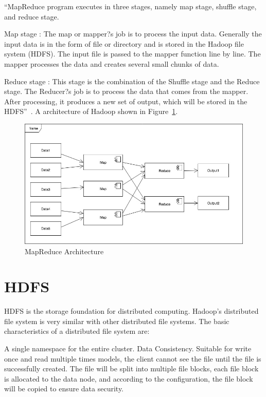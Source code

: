 ``MapReduce program executes in three stages, namely map stage, shuffle stage, and reduce stage.

Map stage : The map or mapper?s job is to process the input data. Generally the input data is in the form of file or directory and is stored in the Hadoop file system (HDFS). The input file is passed to the mapper function line by line. The mapper processes the data and creates several small chunks of data.

Reduce stage : This stage is the combination of the Shuffle stage and the Reduce stage. The Reducer?s job is to process the data that comes from the mapper. After processing, it produces a new set of output, which will be stored in the HDFS''~\cite{mapreduce}.
A architecture of Hadoop shown in Figure~\ref{f:fly}.

\begin{figure}[!ht]
  \centering\includegraphics[width=\columnwidth]{../images/mapReduce.jpg}
  \caption{MapReduce Architecture}\label{f:fly}
\end{figure}

\section{HDFS}
HDFS is the storage foundation for distributed computing. Hadoop's distributed file system is very similar with other distributed file systems. The basic characteristics of a distributed file system are: 

A single namespace for the entire cluster.
Data Consistency.
Suitable for write once and read multiple times models, the client cannot see the file until the file is successfully created. The file will be split into multiple file blocks, each file block is allocated to the data node, and according to the configuration, the file block will be copied to ensure data security.

